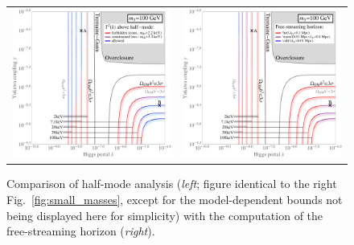 \begin{figure}[ht]
\begin{tabular}{lr}\hspace{-1cm}
 \includegraphics[width=8.3cm]{figures/HM-comparison_100.jpeg} & \includegraphics[width=8.3cm]{figures/FS-comparison_100.jpeg}
\end{tabular}
\caption{\label{fig:FS-comparison}Comparison of half-mode analysis (\emph{left}; figure identical to the right Fig.~\ref{fig:small_masses}, except for the model-dependent bounds not being displayed here for simplicity) with the computation of the free-streaming horizon (\emph{right}).}
\end{figure}

